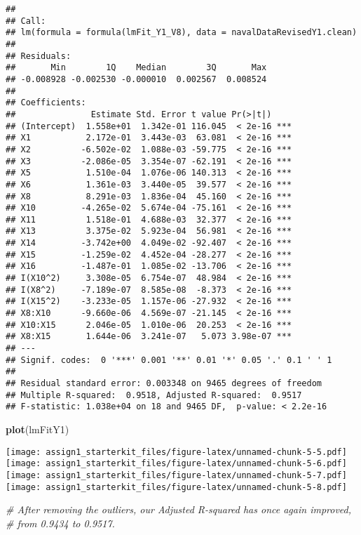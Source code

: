 \documentclass[
]{article}
\newenvironment{Shaded}{\begin{snugshade}}{\end{snugshade}}
\newcommand{\CommentTok}[1]{\textcolor[rgb]{0.56,0.35,0.01}{\textit{#1}}}
\newcommand{\KeywordTok}[1]{\textcolor[rgb]{0.13,0.29,0.53}{\textbf{#1}}}
\newcommand{\NormalTok}[1]{#1}
\begin{document}
\begin{verbatim}
## 
## Call:
## lm(formula = formula(lmFit_Y1_V8), data = navalDataRevisedY1.clean)
## 
## Residuals:
##       Min        1Q    Median        3Q       Max 
## -0.008928 -0.002530 -0.000010  0.002567  0.008524 
## 
## Coefficients:
##               Estimate Std. Error t value Pr(>|t|)    
## (Intercept)  1.558e+01  1.342e-01 116.045  < 2e-16 ***
## X1           2.172e-01  3.443e-03  63.081  < 2e-16 ***
## X2          -6.502e-02  1.088e-03 -59.775  < 2e-16 ***
## X3          -2.086e-05  3.354e-07 -62.191  < 2e-16 ***
## X5           1.510e-04  1.076e-06 140.313  < 2e-16 ***
## X6           1.361e-03  3.440e-05  39.577  < 2e-16 ***
## X8           8.291e-03  1.836e-04  45.160  < 2e-16 ***
## X10         -4.265e-02  5.674e-04 -75.161  < 2e-16 ***
## X11          1.518e-01  4.688e-03  32.377  < 2e-16 ***
## X13          3.375e-02  5.923e-04  56.981  < 2e-16 ***
## X14         -3.742e+00  4.049e-02 -92.407  < 2e-16 ***
## X15         -1.259e-02  4.452e-04 -28.277  < 2e-16 ***
## X16         -1.487e-01  1.085e-02 -13.706  < 2e-16 ***
## I(X10^2)     3.308e-05  6.754e-07  48.984  < 2e-16 ***
## I(X8^2)     -7.189e-07  8.585e-08  -8.373  < 2e-16 ***
## I(X15^2)    -3.233e-05  1.157e-06 -27.932  < 2e-16 ***
## X8:X10      -9.660e-06  4.569e-07 -21.145  < 2e-16 ***
## X10:X15      2.046e-05  1.010e-06  20.253  < 2e-16 ***
## X8:X15       1.644e-06  3.241e-07   5.073 3.98e-07 ***
## ---
## Signif. codes:  0 '***' 0.001 '**' 0.01 '*' 0.05 '.' 0.1 ' ' 1
## 
## Residual standard error: 0.003348 on 9465 degrees of freedom
## Multiple R-squared:  0.9518, Adjusted R-squared:  0.9517 
## F-statistic: 1.038e+04 on 18 and 9465 DF,  p-value: < 2.2e-16
\end{verbatim}

\begin{Shaded}
\begin{Highlighting}[]
\KeywordTok{plot}\NormalTok{(lmFitY1)}
\end{Highlighting}
\end{Shaded}

\texttt{[image: assign1\_starterkit\_files/figure-latex/unnamed-chunk-5-5.pdf]}
\texttt{[image: assign1\_starterkit\_files/figure-latex/unnamed-chunk-5-6.pdf]}
\texttt{[image: assign1\_starterkit\_files/figure-latex/unnamed-chunk-5-7.pdf]}
\texttt{[image: assign1\_starterkit\_files/figure-latex/unnamed-chunk-5-8.pdf]}

\begin{Shaded}
\begin{Highlighting}[]
\CommentTok{# After removing the outliers, our Adjusted R-squared has once again improved, }
\CommentTok{# from 0.9434 to 0.9517. }
\end{Highlighting}
\end{Shaded}
\end{document}
